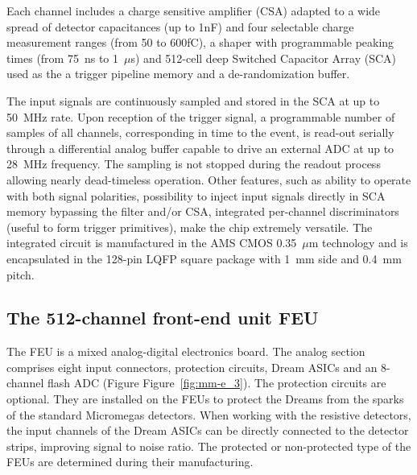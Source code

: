 Each channel includes a charge sensitive amplifier (CSA) adapted to a wide spread of detector capacitances (up to 1nF) and four selectable charge measurement ranges (from 50 to 600fC), a shaper with programmable peaking times (from 75~ns to 1~$\mu$s) and 512-cell deep Switched Capacitor Array (SCA) used as the a trigger pipeline memory and a de-randomization buffer.

The input signals are continuously sampled and stored in the SCA at up to 50~MHz rate. Upon reception of the trigger signal, a programmable number of samples of all channels, corresponding in time to the event, is read-out serially through a differential analog buffer capable to drive an external ADC at up to 28~MHz frequency. The sampling is not stopped during the readout process allowing nearly dead-timeless operation.
Other features, such as ability to operate with both signal polarities, possibility to inject input signals directly in SCA memory bypassing the filter and/or CSA, integrated per-channel discriminators (useful to form trigger primitives), make the chip extremely versatile. The integrated circuit is manufactured in the AMS CMOS 0.35~$\mu$m technology and is encapsulated in the 128-pin LQFP square package with 1~mm side and 0.4~mm pitch.

\subsection{The 512-channel front-end unit FEU}
The FEU is a mixed analog-digital electronics board. The analog section comprises eight input connectors, protection circuits, Dream ASICs and an 8-channel flash ADC (Figure Figure~\ref{fig:mm-e_3}). The protection circuits are optional.  They are installed on the FEUs to protect the Dreams from the sparks of the standard Micromegas detectors. When working with the resistive detectors, the input channels of the Dream ASICs can be directly connected to the detector strips, improving signal to noise ratio. The protected or non-protected type of the FEUs are determined during their manufacturing.

